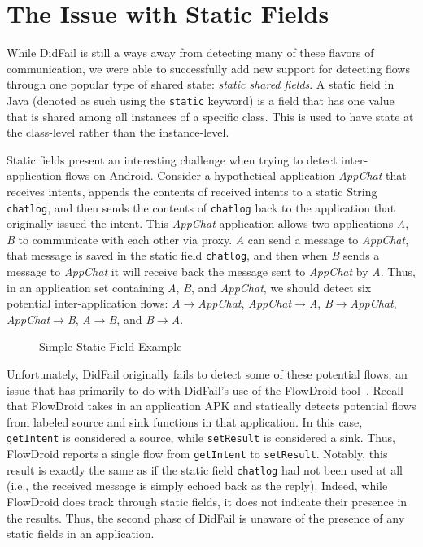 \section{The Issue with Static Fields}

While DidFail is still a ways away from detecting many of these flavors of communication, we were able to successfully add new support for detecting flows through one popular type of shared state: \emph{static shared fields}. A static field in Java (denoted as such using the \texttt{static} keyword) is a field that has one value that is shared among all instances of a specific class. This is used to have state at the class-level rather than the instance-level.

Static fields present an interesting challenge when trying to detect inter-application flows on Android. Consider a hypothetical application \emph{AppChat} that receives intents, appends the contents of received intents to a static String \texttt{chatlog}, and then sends the contents of \texttt{chatlog} back to the application that originally issued the intent. This \emph{AppChat} application allows two applications \emph{A}, \emph{B} to communicate with each other via proxy. \emph{A} can send a message to \emph{AppChat}, that message is saved in the static field \texttt{chatlog}, and then when \emph{B} sends a message to \emph{AppChat} it will receive back the message sent to \emph{AppChat} by \emph{A}. Thus, in an application set containing \emph{A}, \emph{B}, and \emph{AppChat}, we should detect six potential inter-application flows: \emph{A$\rightarrow$AppChat}, \emph{AppChat$\rightarrow$A}, \emph{B$\rightarrow$AppChat}, \emph{AppChat$\rightarrow$B}, \emph{A$\rightarrow$B}, and \emph{B$\rightarrow$A}.

\begin{figure}
\begin{framed}

\caption{Simple Static Field Example}
\label{fig:appchat}
\end{framed}
\end{figure}

Unfortunately, DidFail originally fails to detect some of these potential flows, an issue that has primarily to do with DidFail's use of the FlowDroid tool~\cite{flowdroid}. Recall that FlowDroid takes in an application APK and statically detects potential flows from labeled source and sink functions in that application. In this case, \texttt{getIntent} is considered a source, while \texttt{setResult} is considered a sink. Thus, FlowDroid reports a single flow from \texttt{getIntent} to \texttt{setResult}. Notably, this result is exactly the same as if the static field \texttt{chatlog} had not been used at all (i.e., the received message is simply echoed back as the reply). Indeed, while FlowDroid does track through static fields, it does not indicate their presence in the results. Thus, the second phase of DidFail is unaware of the presence of any static fields in an application.

